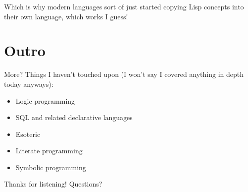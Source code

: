 \documentclass[aspectratio=169]{beamer}
\begin{document}
\begin{frame}
	Which is why modern languages sort of just started copying Lisp concepts into their own language, which works I guess!
\end{frame}

\section{Outro}

\begin{frame}{More?}
	Things I haven't touched upon (I won't say I covered anything in depth today anyways):
	\begin{itemize}
		\item Logic programming
		\item SQL and related declarative languages
		\item Esoteric 
		\item Literate programming
		\item Symbolic programming
	\end{itemize}
\end{frame}

\begin{frame}
	\centering\Huge
	Thanks for listening! Questions?
\end{frame}
\end{document}
